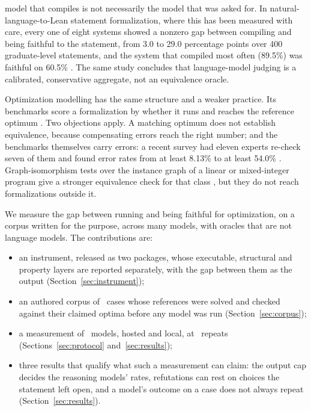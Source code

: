 \documentclass[journal]{IEEEtran}
\begin{document}
 model that compiles is not necessarily the model that was asked for. In
natural-language-to-Lean statement formalization, where this has been measured with care, every one
of eight systems showed a nonzero gap between compiling and being faithful to the statement, from
3.0 to 29.0 percentage points over 400 graduate-level statements, and the system that compiled most
often (89.5\%) was faithful on 60.5\% \cite{lean2026}. The same study concludes that language-model
judging is a calibrated, conservative aggregate, not an equivalence oracle.

Optimization modelling has the same structure and a weaker practice. Its benchmarks score a
formalization by whether it runs and reaches the reference optimum \cite{survey2025,nl4opt2023}.
Two objections apply. A matching optimum does not establish equivalence, because compensating errors
reach the right number; and the benchmarks themselves carry errors: a recent survey had eleven
experts re-check seven of them and found error rates from at least 8.13\% to at least 54.0\%
\cite{survey2025}. Graph-isomorphism tests over the instance graph of a linear or mixed-integer
program give a stronger equivalence check for that class \cite{orgeval2025}, but they do not reach
formalizations outside it.

We measure the gap between running and being faithful for optimization, on a corpus written for the
purpose, across many models, with oracles that are not language models. The contributions are:
\begin{itemize}
\item an instrument, released as two packages, whose executable, structural and property layers are
reported separately, with the gap between them as the output (Section~\ref{sec:instrument});
\item an authored corpus of \nCases\ cases whose references were solved and checked against their
claimed optima before any model was run (Section~\ref{sec:corpus});
\item a measurement of \nModels\ models, hosted and local, at \nRepeats\ repeats
(Sections~\ref{sec:protocol} and~\ref{sec:results});
\item three results that qualify what such a measurement can claim: the output cap decides the
reasoning models' rates, refutations can rest on choices the statement left open, and a model's
outcome on a case does not always repeat (Section~\ref{sec:results}).
\end{itemize}
\end{document}
